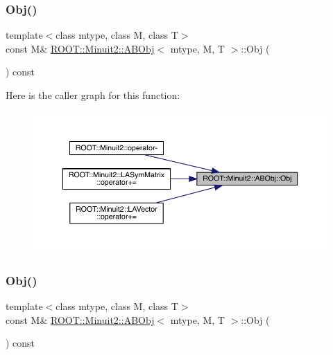 \mbox{\label{classROOT_1_1Minuit2_1_1ABObj_a82bf2a4359c24b894e4e8990185432c1}} 
\subsubsection{\texorpdfstring{Obj()}{Obj()}\hspace{0.1cm}{\footnotesize\ttfamily [1/3]}}
{\footnotesize\ttfamily template$<$class mtype, class M, class T$>$ \\
const M\& \mbox{\hyperlink{classROOT_1_1Minuit2_1_1ABObj}{R\+O\+O\+T\+::\+Minuit2\+::\+A\+B\+Obj}}$<$ mtype, M, T $>$\+::Obj (\begin{DoxyParamCaption}{ }\end{DoxyParamCaption}) const\hspace{0.3cm}{\ttfamily [inline]}}

Here is the caller graph for this function\+:
\nopagebreak
\begin{figure}[H]
\begin{center}
\leavevmode
\includegraphics[width=350pt]{d8/d4e/classROOT_1_1Minuit2_1_1ABObj_a82bf2a4359c24b894e4e8990185432c1_icgraph}
\end{center}
\end{figure}
\mbox{\label{classROOT_1_1Minuit2_1_1ABObj_a82bf2a4359c24b894e4e8990185432c1}} 
\subsubsection{\texorpdfstring{Obj()}{Obj()}\hspace{0.1cm}{\footnotesize\ttfamily [2/3]}}
{\footnotesize\ttfamily template$<$class mtype, class M, class T$>$ \\
const M\& \mbox{\hyperlink{classROOT_1_1Minuit2_1_1ABObj}{R\+O\+O\+T\+::\+Minuit2\+::\+A\+B\+Obj}}$<$ mtype, M, T $>$\+::Obj (\begin{DoxyParamCaption}{ }\end{DoxyParamCaption}) const\hspace{0.3cm}{\ttfamily [inline]}}

